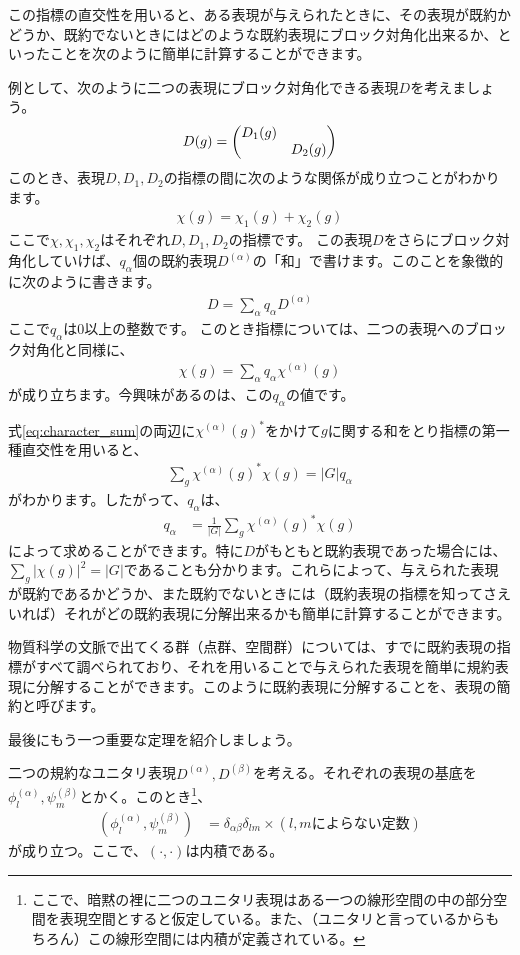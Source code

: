 \documentclass[uplatex,dvipdfmx,a4j,openany]{jsarticle}
\begin{document}
この指標の直交性を用いると、ある表現が与えられたときに、その表現が既約かどうか、既約でないときにはどのような既約表現にブロック対角化出来るか、といったことを次のように簡単に計算することができます。

例として、次のように二つの表現にブロック対角化できる表現$D$を考えましょう。
\begin{align}
	D(g) = \mqty(\dmat{D_1(g), D_2(g)})
\end{align}
このとき、表現$D, D_1, D_2$の指標の間に次のような関係が成り立つことがわかります。
\begin{align}
	\chi(g) = \chi_1(g) + \chi_2(g)
\end{align}
ここで$\chi, \chi_1, \chi_2$はそれぞれ$D, D_1, D_2$の指標です。
この表現$D$をさらにブロック対角化していけば、$q_\alpha$個の既約表現$D^{(\alpha)}$の「和」で書けます。このことを象徴的に次のように書きます。
\begin{align}
	D = \sum_\alpha q_\alpha D^{(\alpha)}
\end{align}
ここで$q_\alpha$は0以上の整数です。
このとき指標については、二つの表現へのブロック対角化と同様に、
\begin{align}
	\chi(g) = \sum_\alpha q_\alpha \chi^{(\alpha)}(g) \label{eq:character_sum}
\end{align}
が成り立ちます。今興味があるのは、この$q_\alpha$の値です。

式\eqref{eq:character_sum}の両辺に$\chi^{(\alpha)}(g)^*$をかけて$g$に関する和をとり指標の第一種直交性を用いると、
\begin{align}
	\sum_g \chi^{(\alpha)}(g)^* \chi(g) = |G|q_\alpha
\end{align}
がわかります。したがって、$q_\alpha$は、
\begin{align}
	q_\alpha &= \frac{1}{|G|}\sum_g \chi^{(\alpha)}(g)^* \chi(g) \label{eq:decompose_character}
\end{align}
によって求めることができます。特に$D$がもともと既約表現であった場合には、$\sum_g |\chi(g)|^2 = |G|$であることも分かります。これらによって、与えられた表現が既約であるかどうか、また既約でないときには（既約表現の指標を知ってさえいれば）それがどの既約表現に分解出来るかも簡単に計算することができます。

物質科学の文脈で出てくる群（点群、空間群）については、すでに既約表現の指標がすべて調べられており、それを用いることで与えられた表現を簡単に規約表現に分解することができます。このように既約表現に分解することを、表現の簡約と呼びます。

最後にもう一つ重要な定理を紹介しましょう。
\begin{tcolorbox}[title=既約表現における基底の直交性]
	二つの規約なユニタリ表現$D^{(\alpha)}, D^{(\beta)}$を考える。それぞれの表現の基底を$\phi^(\alpha)_l, \psi^(\beta)_m$とかく。このとき\footnote{ここで、暗黙の裡に二つのユニタリ表現はある一つの線形空間の中の部分空間を表現空間とすると仮定している。また、（ユニタリと言っているからもちろん）この線形空間には内積が定義されている。}、
	\begin{align}
		(\phi^{(\alpha)}_l, \psi^{(\beta)}_m) &= \delta_{\alpha\beta} \delta_{lm}\times(l, mによらない定数) \label{eq:ortho_basis}
	\end{align}
	が成り立つ。ここで、$(\cdot, \cdot)$は内積である。
\end{tcolorbox}
\end{document}
